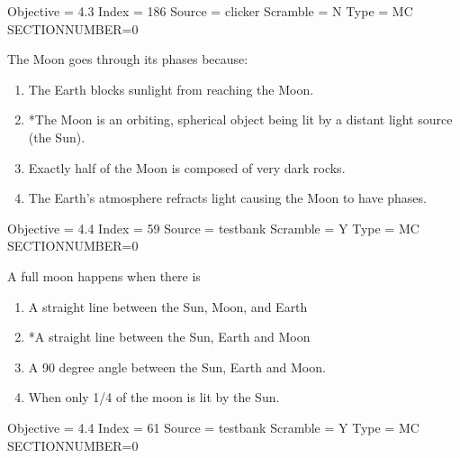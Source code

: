 \documentclass[11pt]{article}
\begin{document}
\begin{enumerate}
\begin{minipage}{\textwidth}
\begin{minipage}{\textwidth}
Objective = 4.3
Index = 186
Source = clicker
Scramble = N
Type = MC
SECTIONNUMBER=0
\end{minipage}
\end{minipage}
\vskip 0.20in

\begin{minipage}{\textwidth}
\begin{minipage}{\textwidth}
\item The Moon goes through its phases because:
\begin{enumerate} 
\setlength{\itemsep}{1pt} 
\setlength{\parskip}{0pt} 
\setlength{\parsep}{0pt}
\setlength{\multicolsep}{1pt} 
\item The Earth blocks sunlight from reaching the Moon.
\item *The Moon is an orbiting, spherical object being lit by a distant light source (the Sun).
\item Exactly half of the Moon is composed of very dark rocks.
\item The Earth's atmosphere refracts light causing the Moon to have phases.
\end{enumerate} 
Objective = 4.4
Index = 59
Source = testbank
Scramble = Y
Type = MC
SECTIONNUMBER=0
\end{minipage}
\end{minipage}
\vskip 0.20in

\begin{minipage}{\textwidth}
\begin{minipage}{\textwidth}
\item A full moon happens when there is
\begin{enumerate} 
\setlength{\itemsep}{1pt} 
\setlength{\parskip}{0pt} 
\setlength{\parsep}{0pt}
\setlength{\multicolsep}{1pt} 
\item A straight line between the Sun, Moon, and Earth
\item *A straight line between the Sun, Earth and Moon
\item A 90 degree angle between the Sun, Earth and Moon.
\item When only 1/4 of the moon is lit by the Sun.
\end{enumerate} 
Objective = 4.4
Index = 61
Source = testbank
Scramble = Y
Type = MC
SECTIONNUMBER=0
\end{minipage}
\end{minipage}
\vskip 0.20in


\end{enumerate}
\end{document}
